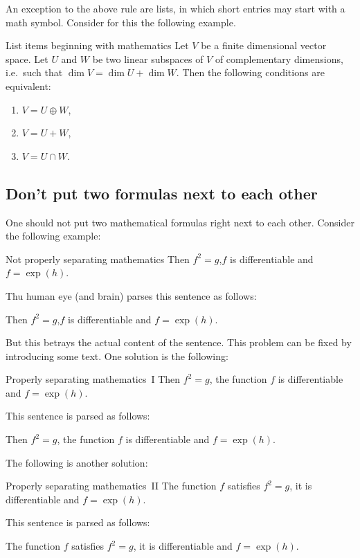 An exception to the above rule are lists, in which short entries may start with a math symbol.
Consider for this the following example.
\begin{showlatex}{List items beginning with mathematics}
Let $V$ be a finite dimensional vector space.
Let $U$ and $W$ be two linear subspaces of $V$ of complementary dimensions, i.e.\ such that $\dim V = \dim U + \dim W$.
Then the following conditions are equivalent:
\begin{enumerate}[label = \roman*)]
  \item
    $V = U \oplus W$,
  \item
    $V = U + W$,
  \item
    $V = U \cap W$.
\end{enumerate}
\end{showlatex}



\subsection{Don’t put two formulas next to each other}

One should not put two mathematical formulas right next to each other.
Consider the following example:
\begin{showlatex}{Not properly separating mathematics}
Then $f^2 = g$,$f$ is differentiable and $f = \exp(h)$.
\end{showlatex}
Thu human eye (and brain) parses this sentence as follows:
\begin{center}
  Then
  \quad
  $f^2 = g$,$f$
  \quad
  is differentiable and
  \quad
  $f = \exp(h)$.
\end{center}
But this betrays the actual content of the sentence.
This problem can be fixed by introducing some text.
One solution is the following:
\begin{showlatex}{Properly separating mathematics~I}
Then $f^2 = g$, the function $f$ is differentiable and $f = \exp(h)$.
\end{showlatex}
This sentence is parsed as follows:
\begin{center}
  Then
  \quad
  $f^2 = g$,
  \quad
  the function
  \quad
  $f$
  \quad
  is differentiable and
  \quad
  $f = \exp(h)$.
\end{center}
The following is another solution:
\begin{showlatex}{Properly separating mathematics~II}
The function $f$ satisfies $f^2 = g$, it is differentiable and $f = \exp(h)$.
\end{showlatex}
This sentence is parsed as follows:
\begin{center}
  The function
  \quad
  $f$
  \quad
  satisfies
  \quad
  $f^2 = g$,
  \quad
  it is differentiable and
  \quad
  $f = \exp(h)$.
\end{center}




